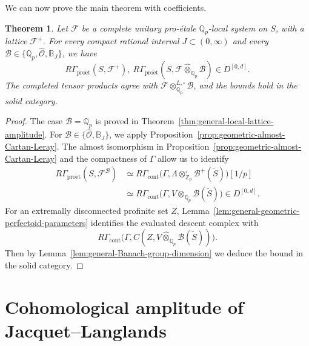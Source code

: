 \documentclass[11pt]{article}
\newtheorem{theorem}{Theorem}[section]
\theoremstyle{definition}
\newcommand{\Qp}{\mathbb Q_p}
\newcommand{\Zp}{\mathbb Z_p}
\newcommand{\proet}{\mathrm{pro\acute et}}
\begin{document}
We can now prove the main theorem with coefficients.

\begin{theorem}
\label{thm:general-unitary-coefficient-amplitude}
Let \(\mathcal F\) be a complete unitary pro-\'etale \(\Qp\)-local system
on \(S\), with a lattice \(\mathcal F^+\).
For every compact rational interval \(J\subset(0,\infty)\)
and every \(\mathscr B\in\{\Qp,\widehat{\mathscr O},\mathbb B_J\}\),
we have
\begin{equation}\label{eq:general-three-coefficient-amplitude}
 R\Gamma_{\proet}(S,\mathcal F^+),\ 
 R\Gamma_{\proet}(S,\mathcal F\widehat{\otimes}_{\Qp}\mathscr B)\in D^{[0,d]}.
\end{equation}
The completed tensor products agree with
\(\mathcal F\otimes_{\Qp}^{L,\square}\mathscr B\), and the bounds hold in the solid category.
\end{theorem}
\begin{proof}
The case $\mathscr{B}=\mathbb{Q}_p$ is proved in Theorem~\ref{thm:general-local-lattice-amplitude}.
For \(\mathscr B\in\{\widehat{\mathscr O},\mathbb B_J\}\), we apply Proposition~\ref{prop:geometric-almost-Cartan-Leray}.
The almost isomorphism in Proposition~\ref{prop:geometric-almost-Cartan-Leray} and the compactness of $\Gamma$ allow us to identify
\begin{equation}\label{eq:general-geometric-Cartan-Leray}
 \begin{aligned}
 R\Gamma_{\proet}(S,\mathcal F^{\mathscr B})
 &\simeq R\Gamma_{\mathrm{cont}}\bigl(\Gamma,
 \Lambda\otimes_{\Zp}^{\square}\mathscr B^+(\widetilde{S})\bigr)[1/p]\\
 &\simeq R\Gamma_{\mathrm{cont}}\bigl(\Gamma,
 V\widehat\otimes_{\Qp}\mathscr B(\widetilde{S})\bigr)
 \in D^{[0,d]}.
 \end{aligned}
\end{equation}
For an extremally disconnected profinite set \(Z\),
Lemma~\ref{lem:general-geometric-perfectoid-parameters} identifies
the evaluated descent complex with
\[
 R\Gamma_{\mathrm{cont}}\bigl(\Gamma,
 C(Z,V\widehat\otimes_{\Qp}\mathscr B(\widetilde{S}))\bigr).
\]
Then by Lemma~\ref{lem:general-Banach-group-dimension} we deduce the bound in the solid category.
\end{proof}


\section{Cohomological amplitude of Jacquet--Langlands}
\label{sec:cohomological-amplitude}
\end{document}
